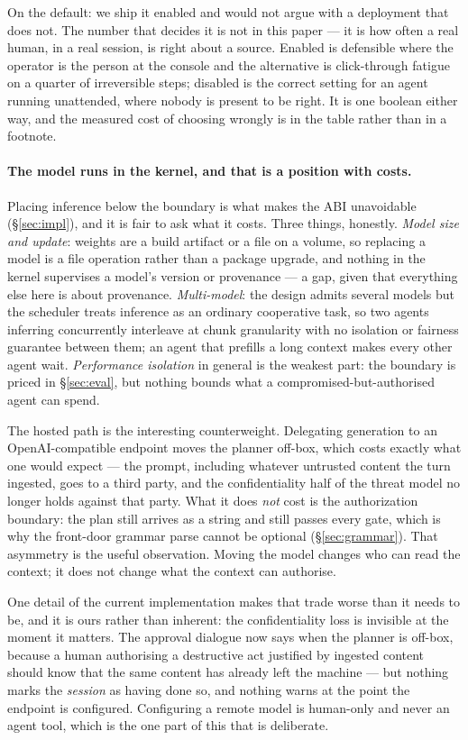 \documentclass[11pt]{article}
\begin{document}
On the default: we ship it enabled and would not argue with a deployment that
does not. The number that decides it is not in this paper --- it is how often a
real human, in a real session, is right about a source. Enabled is defensible
where the operator is the person at the console and the alternative is
click-through fatigue on a quarter of irreversible steps; disabled is the correct
setting for an agent running unattended, where nobody is present to be right. It
is one boolean either way, and the measured cost of choosing wrongly is in the
table rather than in a footnote.

\paragraph{The model runs in the kernel, and that is a position with costs.}
Placing inference below the boundary is what makes the ABI unavoidable
(\S\ref{sec:impl}), and it is fair to ask what it costs. Three things, honestly.
\emph{Model size and update}: weights are a build artifact or a file on a
volume, so replacing a model is a file operation rather than a package upgrade,
and nothing in the kernel supervises a model's version or provenance --- a
gap, given that everything else here is about provenance. \emph{Multi-model}:
the design admits several models but the scheduler treats inference as an
ordinary cooperative task, so two agents inferring concurrently interleave at
chunk granularity with no isolation or fairness guarantee between them; an agent
that prefills a long context makes every other agent wait. \emph{Performance
isolation} in general is the weakest part: the boundary is priced in
\S\ref{sec:eval}, but nothing bounds what a compromised-but-authorised agent
can spend.

The hosted path is the interesting counterweight. Delegating generation to an
OpenAI-compatible endpoint moves the planner off-box, which costs exactly what
one would expect --- the prompt, including whatever untrusted content the turn
ingested, goes to a third party, and the confidentiality half of the threat model
no longer holds against that party. What it does \emph{not} cost is the
authorization boundary: the plan still arrives as a string and still passes every
gate, which is why the front-door grammar parse cannot be optional
(\S\ref{sec:grammar}). That asymmetry is the useful observation. Moving the
model changes who can read the context; it does not change what the context can
authorise.

One detail of the current implementation makes that trade worse than it needs to
be, and it is ours rather than inherent: the confidentiality loss is invisible at
the moment it matters. The approval dialogue now says when the planner is
off-box, because a human authorising a destructive act justified by ingested
content should know that the same content has already left the machine --- but
nothing marks the \emph{session} as having done so, and nothing warns at the
point the endpoint is configured. Configuring a remote model is human-only and
never an agent tool, which is the one part of this that is deliberate.
\end{document}

